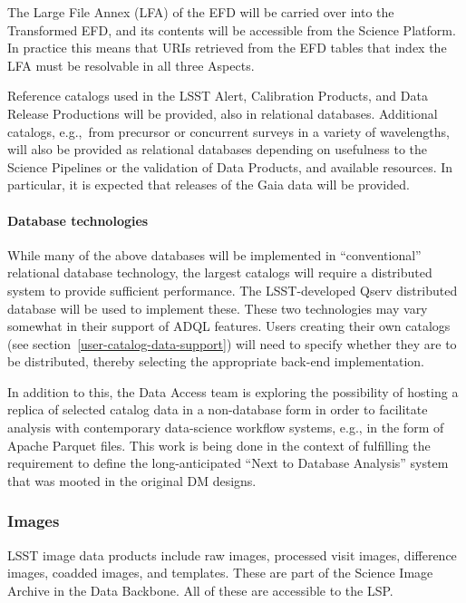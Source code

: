 The Large File Annex (LFA) of the EFD will be carried over into the Transformed
EFD, and its contents will be accessible from the Science Platform.
In practice this means that URIs retrieved from the EFD tables that index the
LFA must be resolvable in all three Aspects.

Reference catalogs used in the LSST Alert, Calibration Products, and Data
Release Productions will be provided, also in relational databases.
Additional catalogs, e.g.,\ from precursor or concurrent surveys in a variety
of wavelengths, will also be provided as relational databases depending on
usefulness to the Science Pipelines or the validation of Data Products,
and available resources.
In particular, it is expected that releases of the Gaia data will be provided.

\paragraph{Database technologies}\label{database-technologies}

While many of the above databases will be implemented in ``conventional''
relational database technology, the largest catalogs will require a distributed
system to provide sufficient performance.
The LSST-developed Qserv distributed database will be used to implement these.
These two technologies may vary somewhat in their support of ADQL features.
Users creating their own catalogs (see section~\ref{user-catalog-data-support})
will need to specify whether they are to be
distributed, thereby selecting the appropriate back-end implementation.

In addition to this, the Data Access team is exploring the possibility of
hosting a replica of selected catalog data in a non-database form in order to
facilitate analysis with contemporary data-science workflow systems, e.g.,
in the form of Apache Parquet files.
This work is being done in the context of fulfilling the requirement to
define the long-anticipated ``Next to Database Analysis'' system that was
mooted in the original DM designs.

\subsubsection{Images}\label{images}

LSST image data products include raw images, processed visit images, difference
images, coadded images, and templates.  These are part of the Science Image
Archive in the Data Backbone.  All of these are accessible to the LSP.

